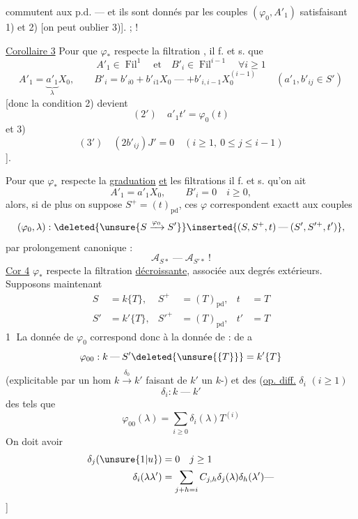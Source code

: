 commutent aux p.d. --- et ils sont donnés par les couples $(\varphi_0,A'_1)$ satisfaisant 1) et 2) [on peut oublier 3)]. ;  !

\uline{Corollaire 3} Pour que $\varphi_*$ respecte la filtration , il f. et s. que
\[
 A'_1\in\operatorname{Fil}^{1}\quad\text{et}\quad B'_i\in\operatorname{Fil}^{i-1}\quad\forall i\geq1
\]
\[
 A'_1=\underbrace{a'_1}_{\lambda}X_0,\qquad
 B'_i=b'_{i0}+b'_{i1}X_0\mathbin{\text{---}}+b'_{i,i-1}X_0^{(i-1)}
 \qquad(a'_1,b'_{ij}\in S')
\]
[donc la condition 2) devient
\[
 (2')\quad a'_1t'=\varphi_0(t)
\]
et 3)
\[
 (3')\quad(2b'_{ij})J'=0\quad(i\geq1,\ 0\leq j\leq i-1)
\]
].

Pour que $\varphi_*$ respecte la \uline{graduation} \uline{et} les filtrations il f. et s. qu'on ait
\[
 A'_1=a'_1X_0,\qquad B'_i=0\quad i\geq0,
\]
alors, si de plus on suppose $S^+=(t)_{\mathrm{pd}}$, ces $\varphi$ correspondent exactt aux couples
\[
 (\varphi_0,\lambda):\deleted{\unsure{S\xrightarrow{\varphi_0}S'}}\inserted{(S,S^+,t)\mathbin{\text{---}}(S',S'^+,t')},
\]
par prolongement canonique :
\[
 \mathcal A_{S*}\mathbin{\text{---}}\mathcal A_{S'*}\ !
\]
\uline{Cor 4} $\varphi_*$ respecte  la filtration \uline{décroissante}, associée aux degrés extérieurs.
Supposons maintenant
\[
 \begin{aligned}
 S&=k\{T\},&S^+&=(T)_{\mathrm{pd}},&t&=T\\
 S'&=k'\{T\},&S'^+&=(T)_{\mathrm{pd}},&t'&=T
 \end{aligned}
\]
\textcircled{1} La donnée de $\varphi_0$ correspond donc à la donnée de :
de \textcircled{a}
\[
 \varphi_{00}:k\mathbin{\text{---}}S'\deleted{\unsure{\{T\}}}=k'\{T\}
\]
(explicitable par un hom $k\xrightarrow{\delta_0}k'$ faisant de $k'$ un $k$-) et des (\uline{op. diff.} $\delta_i$ $(i\geq1)$
\[
 \delta_i:k\mathbin{\text{---}}k'
\]
des tels que
\[
 \varphi_{00}(\lambda)=\sum_{i\geq0}\delta_i(\lambda)T^{(i)}
\]
On doit avoir
\[
 \begin{aligned}
 \delta_j(\unsure{1|u})&=0\quad j\geq1\\
 \delta_i(\lambda\lambda')&=\sum_{j+h=i}C_{j,h}\delta_j(\lambda)\delta_h(\lambda')\mathbin{\text{---}}
 \end{aligned}
\]
]
